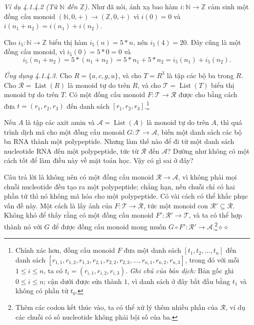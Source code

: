 \noindent\textit{Ví dụ 4.1.4.2 (Từ $\mathbb{N}$ đến $\mathbb{Z}$).} Như đã nói, ánh xạ bao hàm $i:\mathbb{N}\to\mathbb{Z}$ cảm sinh một đồng cấu monoid $(\mathbb{N},0,+)\to(\mathbb{Z},0,+)$ vì $i(0)=0$ và $i(n_1+n_2)=i(n_1)+i(n_2)$.

Cho $i_5:\mathbb{N}\to\mathbb{Z}$ biểu thị hàm $i_5(n)=5*n$, nên $i_5(4)=20$. Đây cũng là một đồng cấu monoid, vì $i_5(0)=5*0=0$ và
\[
i_5(n_1+n_2)=5*(n_1+n_2)=5*n_1+5*n_2=i_5(n_1)+i_5(n_2).
\]

\noindent\textit{Ứng dụng 4.1.4.3.} Cho $R=\{a,c,g,u\}$, và cho $T=R^3$ là tập các bộ ba trong $R$. Cho $\mathcal{R}=\operatorname{List}(R)$ là monoid tự do trên $R$, và cho $\mathcal{T}=\operatorname{List}(T)$ biểu thị monoid tự do trên $T$. Có một đồng cấu monoid $F:\mathcal{T}\to\mathcal{R}$ được cho bằng cách đưa $t=(r_1,r_2,r_3)$ đến danh sách $[r_1,r_2,r_3]$.\footnote{\raggedright Chính xác hơn, đồng cấu monoid $F$ đưa một danh sách $[t_1,t_2,\ldots,t_n]$ đến danh sách $[r_{1,1},r_{1,2},r_{1,3},r_{2,1},r_{2,2},r_{2,3},\ldots,r_{n,1},r_{n,2},r_{n,3}]$, trong đó với mỗi $1\le i\le n$, ta có $t_i=(r_{i,1},r_{i,2},r_{i,3})$. \emph{Ghi chú của bản dịch:} Bản gốc ghi $0\le i\le n$; cận dưới được sửa thành $1$, vì danh sách ở đây bắt đầu bằng $t_1$ và không có phần tử $t_0$.}

Nếu $A$ là tập các axit amin và $\mathcal{A}=\operatorname{List}(A)$ là monoid tự do trên $A$, thì quá trình dịch mã cho một đồng cấu monoid $G:\mathcal{T}\to\mathcal{A}$, biến một danh sách các bộ ba RNA thành một polypeptide. Nhưng làm thế nào để đi từ một danh sách nucleotide RNA đến một polypeptide, tức từ $\mathcal{R}$ đến $\mathcal{A}$? Dường như không có một cách tốt để làm điều này về mặt toán học. Vậy có gì sai ở đây?

Câu trả lời là không nên có một đồng cấu monoid $\mathcal{R}\to\mathcal{A}$, vì không phải mọi chuỗi nucleotide đều tạo ra một polypeptide; chẳng hạn, nếu chuỗi chỉ có hai phần tử thì nó không mã hóa cho một polypeptide. Có vài cách có thể khắc phục vấn đề này. Một cách là lấy ảnh của $F:\mathcal{T}\to\mathcal{R}$, tức một monoid con $\mathcal{R}'\subseteq\mathcal{R}$. Không khó để thấy rằng có một đồng cấu monoid $F':\mathcal{R}'\to\mathcal{T}$, và ta có thể hợp thành nó với $G$ để được đồng cấu monoid mong muốn $G\circ F':\mathcal{R}'\to\mathcal{A}$.\footnote{Thêm các codon kết thúc vào, ta có thể xử lý thêm nhiều phần của $\mathcal{R}$, ví dụ các chuỗi có số nucleotide không phải bội số của ba.}\nobreak\hfill$\diamond\diamond$

